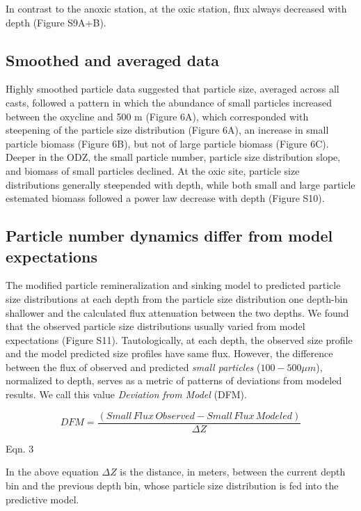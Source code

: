 \documentclass[]{article}
\begin{document}
In contrast to the anoxic station, at the oxic station, flux always
decreased with depth (Figure S9A+B).

\hypertarget{smoothed-and-averaged-data}{%
\subsection{Smoothed and averaged
data}\label{smoothed-and-averaged-data}}

Highly smoothed particle data suggested that particle size, averaged
across all casts, followed a pattern in which the abundance of small
particles increased between the oxycline and 500 m (Figure 6A), which
corresponded with steepening of the particle size distribution (Figure
6A), an increase in small particle biomass (Figure 6B), but not of large
particle biomass (Figure 6C). Deeper in the ODZ, the small particle
number, particle size distribution slope, and biomass of small particles
declined. At the oxic site, particle size distributions generally
steepended with depth, while both small and large particle estemated
biomass followed a power law decrease with depth (Figure S10).

\hypertarget{particle-number-dynamics-differ-from-model-expectations}{%
\subsection{Particle number dynamics differ from model
expectations}\label{particle-number-dynamics-differ-from-model-expectations}}

The modified particle remineralization and sinking model to predicted
particle size distributions at each depth from the particle size
distribution one depth-bin shallower and the calculated flux attenuation
between the two depths. We found that the observed particle size
distributions usually varied from model expectations (Figure S11).
Tautologically, at each depth, the observed size profile and the model
predicted size profiles have same flux. However, the difference between
the flux of observed and predicted \emph{small particles}
(\(100-500 \mu m\)), normalized to depth, serves as a metric of patterns
of deviations from modeled results. We call this value \emph{Deviation
from Model} (DFM).

\[ DFM = \frac{(Small\,Flux\,Observed - Small\,Flux\,Modeled)}{\Delta Z}\]

Eqn. 3

In the above equation \(\Delta Z\) is the distance, in meters, between
the current depth bin and the previous depth bin, whose particle size
distribution is fed into the predictive model.
\end{document}
